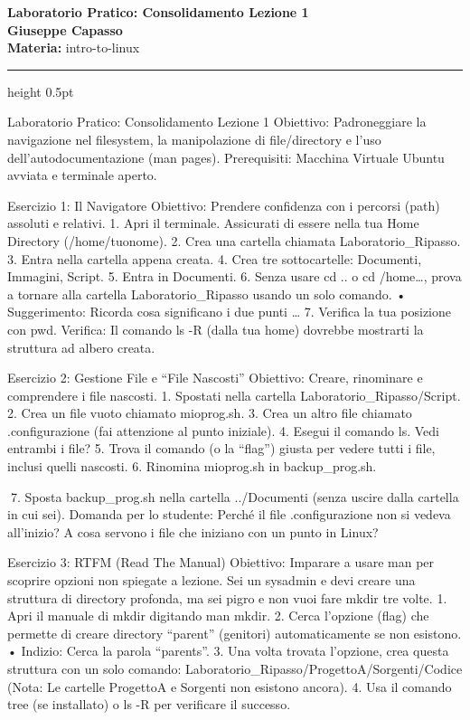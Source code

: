 \documentclass[11pt,a4paper]{article}
\newcommand{\proposaltitle}[1]{
    \begin{center}
        \vspace*{0.1cm}
        {\LARGE \bfseries \color{blue} #1} \\[1.5ex]
        {\large \textbf{Giuseppe Capasso}} \\[1ex]
                \small{
            \vspace{0.1cm}
            \textbf{Materia:} intro-to-linux\\
        }
            \end{center}
    \vspace{0.3cm}
    \hrule height 0.5pt
    \vspace{0.5cm}
}
\begin{document}
\proposaltitle{Laboratorio Pratico: Consolidamento Lezione 1}

Laboratorio Pratico: Consolidamento Lezione 1 Obiettivo: Padroneggiare
la navigazione nel filesystem, la manipolazione di file/directory e
l'uso dell'autodocumentazione (man pages). Prerequisiti: Macchina
Virtuale Ubuntu avviata e terminale aperto.

Esercizio 1: Il Navigatore Obiettivo: Prendere confidenza con i percorsi
(path) assoluti e relativi. 1. Apri il terminale. Assicurati di essere
nella tua Home Directory (/home/tuonome). 2. Crea una cartella chiamata
Laboratorio\_Ripasso. 3. Entra nella cartella appena creata. 4. Crea tre
sottocartelle: Documenti, Immagini, Script. 5. Entra in Documenti. 6.
Senza usare cd .. o cd /home\ldots, prova a tornare alla cartella
Laboratorio\_Ripasso usando un solo comando. • Suggerimento: Ricorda
cosa significano i due punti \ldots{} 7. Verifica la tua posizione con
pwd. Verifica: Il comando ls -R (dalla tua home) dovrebbe mostrarti la
struttura ad albero creata.

Esercizio 2: Gestione File e ``File Nascosti'' Obiettivo: Creare,
rinominare e comprendere i file nascosti. 1. Spostati nella cartella
Laboratorio\_Ripasso/Script. 2. Crea un file vuoto chiamato mioprog.sh.
3. Crea un altro file chiamato .configurazione (fai attenzione al punto
iniziale). 4. Esegui il comando ls. Vedi entrambi i file? 5. Trova il
comando (o la ``flag'') giusta per vedere tutti i file, inclusi quelli
nascosti. 6. Rinomina mioprog.sh in backup\_prog.sh.

7. Sposta backup\_prog.sh nella cartella ../Documenti (senza uscire
dalla cartella in cui sei). Domanda per lo studente: Perché il file
.configurazione non si vedeva all'inizio? A cosa servono i file che
iniziano con un punto in Linux?

Esercizio 3: RTFM (Read The Manual) Obiettivo: Imparare a usare man per
scoprire opzioni non spiegate a lezione. Sei un sysadmin e devi creare
una struttura di directory profonda, ma sei pigro e non vuoi fare mkdir
tre volte. 1. Apri il manuale di mkdir digitando man mkdir. 2. Cerca
l'opzione (flag) che permette di creare directory ``parent'' (genitori)
automaticamente se non esistono. • Indizio: Cerca la parola ``parents''.
3. Una volta trovata l'opzione, crea questa struttura con un solo
comando: Laboratorio\_Ripasso/ProgettoA/Sorgenti/Codice (Nota: Le
cartelle ProgettoA e Sorgenti non esistono ancora). 4. Usa il comando
tree (se installato) o ls -R per verificare il successo.
\end{document}
